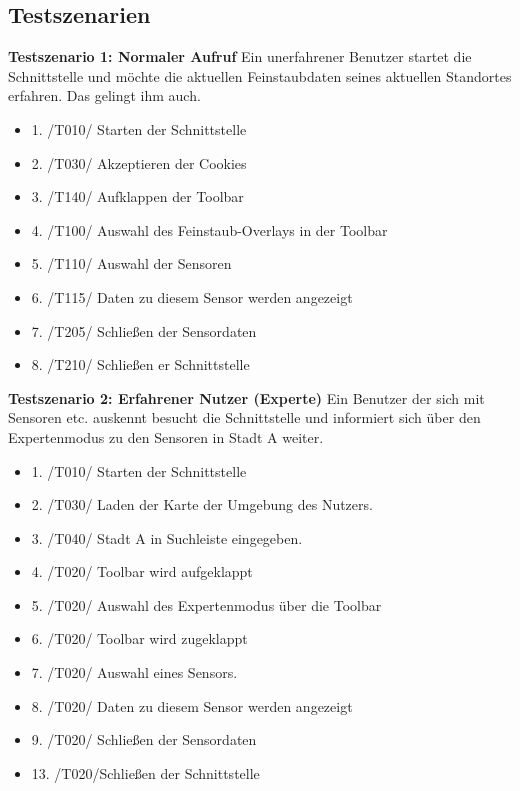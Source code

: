 \subsection{Testszenarien}

\textbf{Testszenario 1: Normaler Aufruf}
\newline
Ein unerfahrener Benutzer startet die Schnittstelle und möchte die aktuellen Feinstaubdaten seines aktuellen Standortes erfahren. Das gelingt ihm auch.
\begin{itemize}
    \item 1. /T010/ Starten der Schnittstelle
    \item 2. /T030/ Akzeptieren der Cookies
    \item 3. /T140/ Aufklappen der Toolbar
    \item 4. /T100/ Auswahl des Feinstaub-Overlays in der Toolbar
    \item 5. /T110/ Auswahl der Sensoren
    \item 6. /T115/ Daten zu diesem Sensor werden angezeigt
    \item 7. /T205/ Schließen der Sensordaten
    \item 8. /T210/ Schließen er Schnittstelle
\end{itemize}

\textbf{Testszenario 2: Erfahrener Nutzer (Experte)}
\newline
Ein Benutzer der sich mit Sensoren etc. auskennt besucht die Schnittstelle und informiert sich über den Expertenmodus zu den Sensoren in Stadt A weiter.
\begin{itemize}
    \item 1. /T010/ Starten der Schnittstelle
    \item 2. /T030/ Laden der Karte der Umgebung des Nutzers.
    \item 3. /T040/ Stadt A in Suchleiste eingegeben.
    \item 4. /T020/ Toolbar wird aufgeklappt
    \item 5. /T020/ Auswahl des Expertenmodus über die Toolbar
    \item 6. /T020/ Toolbar wird zugeklappt
    \item 7. /T020/ Auswahl eines Sensors.
    \item 8. /T020/ Daten zu diesem Sensor werden angezeigt
    \item 9. /T020/ Schließen der Sensordaten
    \item 13. /T020/Schließen der Schnittstelle
\end{itemize}

